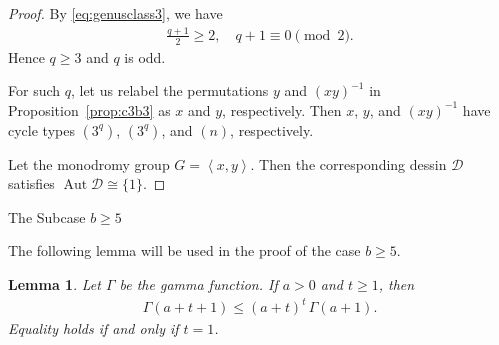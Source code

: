 \documentclass[12pt,reqno]{amsart}
\makeatletter
\newif\if@noindentafterheading
\renewcommand\subsection{\@startsection{subsection}{2}{\z@}%
  {-2.5ex \@plus -.3ex \@minus -.2ex}%
  {1.5ex \@plus .2ex}%
  {\normalfont\bfseries}%
}
\let\orig@subsection\subsection
\renewcommand\subsection{%
  \@ifstar{\subsection@star}{\subsection@nostar}%
}
\newcommand\subsection@nostar{%
  \@ifnextchar[{\subsection@opt}{\subsection@noopt}%
}
\newcommand\subsection@opt[2][]{%
  \global\@noindentafterheadingtrue
  \orig@subsection[#1]{#2}%
  \global\@noindentafterheadingfalse
}
\newcommand\subsection@noopt[1]{%
  \global\@noindentafterheadingtrue
  \orig@subsection{#1}%
  \global\@noindentafterheadingfalse
}
\newcommand\subsection@star[1]{%
  \global\@noindentafterheadingtrue
  \orig@subsection*{#1}%
  \global\@noindentafterheadingfalse
}
\newcommand{\msD}{\mathscr{D}}
\newcommand{\f}[2]{\frac{#1}{#2}}							%
\newcommand{\gen}[1]{\left\langle #1 \right\rangle}				%
\DeclareMathOperator{\Aut}{Aut}							%
\theoremstyle{mythmstyle}
\newtheorem{lemma}{Lemma}[section]
\theoremstyle{mydefstyle}
\newcommand{\propref}[1]{Proposition~\ref{#1}}
\newcommand{\AD}{\Aut{\msD}}
\numberwithin{equation}{section}
\makeatother
\begin{document}
\begin{proof}
By \eqref{eq:genusclass3}, we have
\begin{align}
\f{q+1}{2} \ge 2, \quad q+1 \equiv 0 \pmod{2}.
\end{align}
Hence $q \ge 3$ and $q$ is odd.

For such $q$, let us relabel the permutations $y$ and $(xy)^{-1}$ in \propref{prop:c3b3}
as $x$ and $y$, respectively.
Then $x$, $y$, and $(xy)^{-1}$ have cycle types $(3^{q})$, $(3^{q})$, and $(n)$, respectively.

Let the monodromy group $G = \gen{x, y}$. Then the corresponding dessin $\msD$ satisfies $\AD \cong \{ 1 \}$.
\end{proof}

\subsection{The Subcase $b \ge 5$}

The following lemma will be used in the proof of the case $b \ge 5$.

\begin{lemma}
\label{lem:gamma-at}
Let $\Gamma$ be the gamma function. If $a > 0$ and $t \ge 1$, then
\begin{align}
\Gamma(a+t+1) \le (a+t)^{t}\,\Gamma(a+1).
\end{align}
Equality holds if and only if $t=1$.
\end{lemma}
\end{document}
